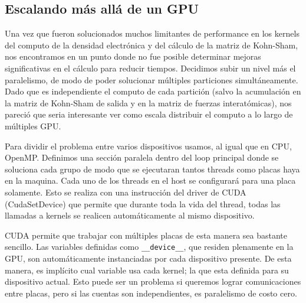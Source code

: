 %

\subsection{Escalando m\'as all\'a de un GPU}
Una vez que fueron solucionados muchos limitantes de performance en los kernels del computo
de la densidad electr\'onica y del c\'alculo de la matriz de Kohn-Sham, nos encontramos en un punto donde
no fue posible determinar mejoras significativas en el c\'alculo para reducir tiempos.
Decidimos subir un nivel m\'as el paralelismo, de modo de poder solucionar m\'ultiples particiones
simult\'aneamente. Dado que es independiente el computo de cada partici\'on (salvo la acumulaci\'on
en la matriz de Kohn-Sham de salida y en la matriz de fuerzas interat\'omicas), nos pareci\'o que seria
interesante ver como escala distribuir el computo a lo largo de m\'ultiples GPU.

Para dividir el problema entre varios dispositivos usamos, al igual que en CPU, OpenMP. Definimos
una secci\'on paralela dentro del loop principal donde se soluciona cada grupo de modo que se
ejecutaran tantos threads como placas haya en la maquina. Cada
uno de los threads en el host se configurar\'a para una placa solamente. Esto se realiza con
una instrucci\'on del driver de CUDA (CudaSetDevice) que permite que durante toda la vida del
thread, todas las llamadas a kernels se realicen autom\'aticamente al mismo dispositivo.

CUDA permite que trabajar con m\'ultiples placas de esta manera sea bastante sencillo. Las variables
definidas como \texttt{\_\_device\_\_}, que residen plenamente en la GPU, son autom\'aticamente instanciadas
por cada dispositivo presente. De esta manera, es impl\'icito cual variable usa cada kernel; la que
esta definida para su dispositivo actual. Esto puede ser un problema si queremos lograr comunicaciones entre placas,
pero si las cuentas son independientes, es paralelismo de costo cero.

